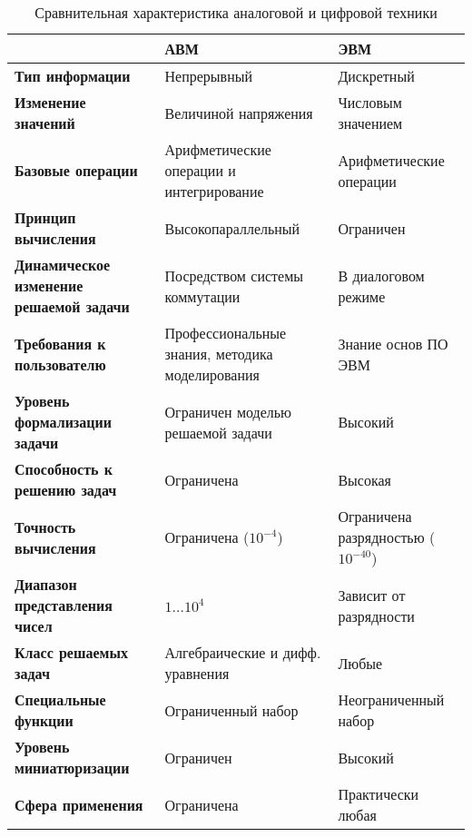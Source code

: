 \begin{table}[H]
    \renewcommand{\arraystretch}{1.5}
    \caption{Сравнительная характеристика аналоговой и цифровой техники}
    \begin{tabularx}{\textwidth} {
            >{\raggedright\arraybackslash}X
            >{\centering\arraybackslash}X
            >{\centering\arraybackslash}X}
        \toprule
                                                        & \textbf{АВМ}                                    & \textbf{ЭВМ}                         \\
        \midrule
        \textbf{Тип информации}                         & Непрерывный                                     & Дискретный                           \\
        \textbf{Изменение значений}                     & Величиной напряжения                            & Числовым значением                   \\
        \textbf{Базовые операции}                       & Арифметические операции и интегрирование        & Арифметические операции              \\
        \textbf{Принцип вычисления}                     & Высокопараллельный                              & Ограничен                            \\
        \textbf{Динамическое изменение решаемой задачи} & Посредством системы коммутации                  & В диалоговом режиме                  \\
        \textbf{Требования к пользователю}              & Профессиональные знания, методика моделирования & Знание основ ПО ЭВМ                  \\
        \textbf{Уровень формализации задачи}            & Ограничен моделью решаемой задачи               & Высокий                              \\
        \textbf{Способность к решению задач}            & Ограничена                                      & Высокая                              \\
        \textbf{Точность вычисления}                    & Ограничена ($10^{-4}$)                          & Ограничена разрядностью ($10^{-40}$) \\
        \textbf{Диапазон представления чисел}           & $1\dots10^4$                                    & Зависит от разрядности               \\
        \textbf{Класс решаемых задач}                   & Алгебраические и дифф. уравнения                & Любые                                \\
        \textbf{Специальные функции}                    & Ограниченный набор                              & Неограниченный набор                 \\
        \textbf{Уровень миниатюризации}                 & Ограничен                                       & Высокий                              \\
        \textbf{Сфера применения}                       & Ограничена                                      & Практически любая                    \\
        \bottomrule
    \end{tabularx}
\end{table}

